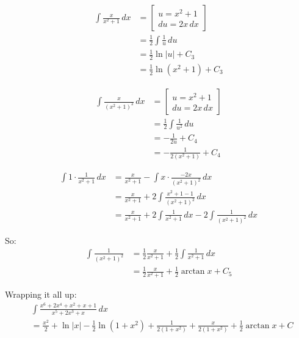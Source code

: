 \documentclass[11pt]{article}
\begin{document}
\begin{align*}
\int \frac{x}{x^2 + 1} \, dx &= \left[ \begin{gathered} u = x^2 + 1 \\ du = 2x \, dx \end{gathered} \right] \\
&= \frac{1}{2} \int \frac{1}{u} \, du \\
&= \frac{1}{2} \ln |u| + C_3 \\
&= \frac{1}{2} \ln (x^2 + 1) + C_3
\end{align*}

\begin{align*}
\int \frac{x}{(x^2 + 1)^2} \, dx &= \left[ \begin{gathered} u = x^2 + 1 \\ du = 2x \, dx \end{gathered} \right] \\
&= \frac{1}{2} \int \frac{1}{u^2} \, du \\
&= - \frac{1}{2u} + C_4 \\
&= - \frac{1}{2(x^2 + 1)} + C_4
\end{align*}

\begin{align*}
\int 1 \cdot \frac{1}{x^2 + 1} \, dx &= \frac{x}{x^2 + 1} - \int x \cdot \frac{-2x}{(x^2 + 1)^2} \, dx \\
&= \frac{x}{x^2 + 1} + 2 \int \frac{x^2 + 1 - 1}{(x^2 + 1)^2} \, dx \\
&= \frac{x}{x^2 + 1} + 2 \int \frac{1}{x^2 + 1} \, dx - 2 \int \frac{1}{(x^2 + 1)^2} \, dx
\end{align*}

So:
\begin{align*}
\int \frac{1}{(x^2 + 1)^2} &= \frac{1}{2} \frac{x}{x^2 + 1} + \frac{1}{2} \int \frac{1}{x^2 + 1} \, dx \\
&= \frac{1}{2} \frac{x}{x^2 + 1} + \frac{1}{2} \arctan x + C_5
\end{align*}

Wrapping it all up:
\begin{align*}
&\int \frac{x^6 + 2x^4 + x^2 + x + 1}{x^5 + 2x^3 + x} \, dx \\
&= \frac{x^2}{2} + \ln |x| - \frac{1}{2} \ln (1 + x^2) + \frac{1}{2(1 + x^2)} + \frac{x}{2(1 + x^2)} + \frac{1}{2} \arctan x + C
\end{align*}
\end{document}

